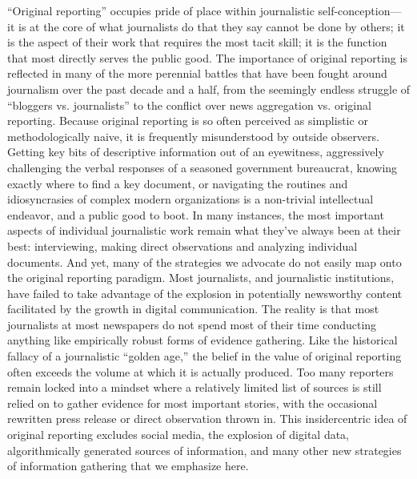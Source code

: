 ``Original reporting'' occupies pride of place within journalistic self-conception—
it is at the core of what journalists do that they say cannot be done by
others; it is the aspect of their work that requires the most tacit skill; it is the
function that most directly serves the public good. The importance of original
reporting is reflected in many of the more perennial battles that have been fought
around journalism over the past decade and a half, from the seemingly endless
struggle of ``bloggers vs. journalists'' to the conflict over news aggregation vs.
original reporting.
Because original reporting is so often perceived as simplistic or methodologically
naive, it is frequently misunderstood by outside observers. Getting key bits of
descriptive information out of an eyewitness, aggressively challenging the verbal
responses of a seasoned government bureaucrat, knowing exactly where to
find a key document, or navigating the routines and idiosyncrasies of complex
modern organizations is a non-trivial intellectual endeavor, and a public good
to boot. In many instances, the most important aspects of individual journalistic
work remain what they’ve always been at their best: interviewing, making direct
observations and analyzing individual documents.
And yet, many of the strategies we advocate do not easily map onto the original
reporting paradigm. Most journalists, and journalistic institutions, have failed to
take advantage of the explosion in potentially newsworthy content facilitated by
the growth in digital communication. The reality is that most journalists at most
newspapers do not spend most of their time conducting anything like empirically
robust forms of evidence gathering. Like the historical fallacy of a journalistic
``golden age,'' the belief in the value of original reporting often exceeds the
volume at which it is actually produced.
Too many reporters remain locked into a mindset where a relatively limited list
of sources is still relied on to gather evidence for most important stories, with the
occasional rewritten press release or direct observation thrown in. This insidercentric
idea of original reporting excludes social media, the explosion of digital
data, algorithmically generated sources of information, and many other new
strategies of information gathering that we emphasize here.

